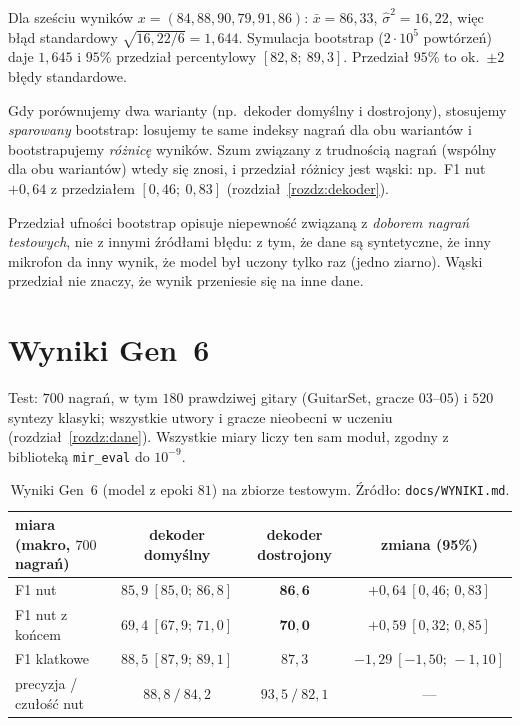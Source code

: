 \begin{naliczbach}
Dla sześciu wyników $x=(84,88,90,79,91,86)$: $\bar x=86{,}33$, $\hat\sigma^2=16{,}22$, więc błąd standardowy $\sqrt{16{,}22/6}=1{,}644$. Symulacja bootstrap ($2\cdot10^5$ powtórzeń) daje $1{,}645$ i $95\%$ przedział percentylowy $[82{,}8;\ 89{,}3]$. Przedział $95\%$ to ok.\ $\pm2$ błędy standardowe.
\end{naliczbach}

Gdy porównujemy dwa warianty (np.\ dekoder domyślny i dostrojony), stosujemy \emph{sparowany} bootstrap: losujemy te same indeksy nagrań dla obu wariantów i bootstrapujemy \emph{różnicę} wyników. Szum związany z trudnością nagrań (wspólny dla obu wariantów) wtedy się znosi, i przedział różnicy jest wąski: np.\ F1 nut $+0{,}64$ z przedziałem $[0{,}46;\ 0{,}83]$ (rozdział~\ref{rozdz:dekoder}).

\begin{pulapka}
Przedział ufności bootstrap opisuje niepewność związaną z \emph{doborem nagrań testowych}, nie z innymi źródłami błędu: z tym, że dane są syntetyczne, że inny mikrofon da inny wynik, że model był uczony tylko raz (jedno ziarno). Wąski przedział nie znaczy, że wynik przeniesie się na inne dane.
\end{pulapka}

\section{Wyniki Gen~6}

Test: $700$ nagrań, w tym $180$ prawdziwej gitary (GuitarSet, gracze $03$--$05$) i $520$ syntezy klasyki; wszystkie utwory i gracze nieobecni w uczeniu (rozdział~\ref{rozdz:dane}). Wszystkie miary liczy ten sam moduł, zgodny z biblioteką \texttt{mir\_eval} do $10^{-9}$.

\begin{table}[ht]
\centering\small
\begin{tabular}{@{}lccc@{}}
\toprule
miara (makro, $700$ nagrań) & dekoder domyślny & dekoder dostrojony & zmiana (95\%)\\
\midrule
F1 nut & $85{,}9\ [85{,}0;\,86{,}8]$ & $\mathbf{86{,}6}$ & $+0{,}64\ [0{,}46;\,0{,}83]$\\
F1 nut z końcem & $69{,}4\ [67{,}9;\,71{,}0]$ & $\mathbf{70{,}0}$ & $+0{,}59\ [0{,}32;\,0{,}85]$\\
F1 klatkowe & $88{,}5\ [87{,}9;\,89{,}1]$ & $87{,}3$ & $-1{,}29\ [-1{,}50;\,-1{,}10]$\\
precyzja / czułość nut & $88{,}8\ /\ 84{,}2$ & $93{,}5\ /\ 82{,}1$ & ---\\
\bottomrule
\end{tabular}
\caption{Wyniki Gen~6 (model z epoki $81$) na zbiorze testowym. Źródło: \texttt{docs/WYNIKI.md}.}
\label{tab:wyniki-test}
\end{table}

